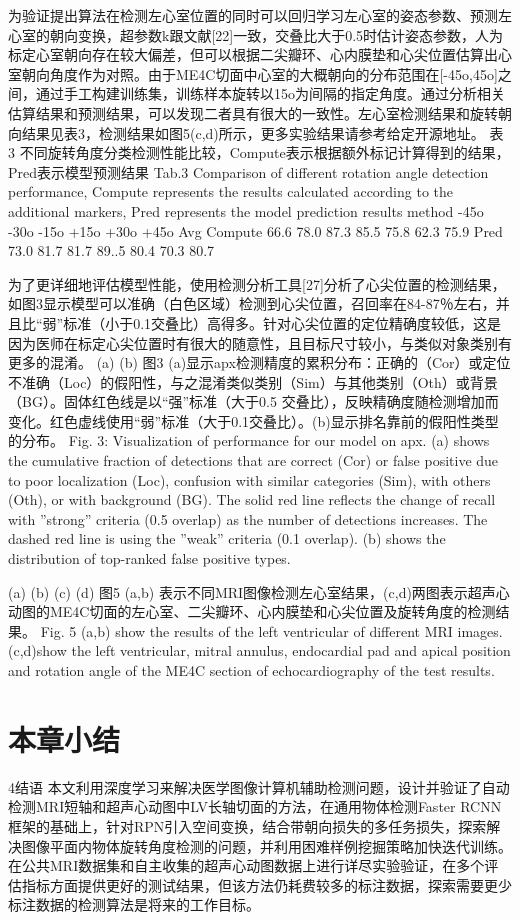 为验证提出算法在检测左心室位置的同时可以回归学习左心室的姿态参数、预测左心室的朝向变换，超参数k跟文献[22]一致，交叠比大于0.5时估计姿态参数，人为标定心室朝向存在较大偏差，但可以根据二尖瓣环、心内膜垫和心尖位置估算出心室朝向角度作为对照。由于ME4C切面中心室的大概朝向的分布范围在[-45o,45o]之间，通过手工构建训练集，训练样本旋转以15o为间隔的指定角度。通过分析相关估算结果和预测结果，可以发现二者具有很大的一致性。左心室检测结果和旋转朝向结果见表3，检测结果如图5(c,d)所示，更多实验结果请参考给定开源地址。
表 3 不同旋转角度分类检测性能比较，Compute表示根据额外标记计算得到的结果，Pred表示模型预测结果
Tab.3 Comparison of different rotation angle detection performance, Compute represents the results calculated according to the additional markers, Pred represents the model prediction results
method                -45o          -30o          -15o           +15o          +30o          +45o            Avg
Compute	66.6	78.0	87.3	85.5	75.8	62.3	75.9
Pred	73.0	81.7	81.7	89..5	80.4	70.3	80.7

为了更详细地评估模型性能，使用检测分析工具[27]分析了心尖位置的检测结果，如图3显示模型可以准确（白色区域）检测到心尖位置，召回率在84-87％左右，并且比“弱”标准（小于0.1交叠比）高得多。针对心尖位置的定位精确度较低，这是因为医师在标定心尖位置时有很大的随意性，且目标尺寸较小，与类似对象类别有更多的混淆。
 	                      (a)			                              (b)        
图3 (a)显示apx检测精度的累积分布：正确的（Cor）或定位不准确（Loc）的假阳性，与之混淆类似类别（Sim）与其他类别（Oth）或背景（BG）。固体红色线是以“强”标准（大于0.5 交叠比），反映精确度随检测增加而变化。红色虚线使用“弱”标准（大于0.1交叠比）。(b)显示排名靠前的假阳性类型的分布。
Fig. 3: Visualization of performance for our model on apx. (a) shows the cumulative fraction of detections that are correct (Cor) or false positive due to poor localization (Loc), confusion with similar categories (Sim), with others (Oth), or with background (BG). The solid red line reflects the change of recall with ”strong” criteria (0.5 overlap) as the number of detections increases. The dashed red line is using the ”weak” criteria (0.1 overlap). (b) shows the distribution of top-ranked false positive types.
 
      (a)                  (b)                     (c)                   (d)
图5 (a,b) 表示不同MRI图像检测左心室结果，(c,d)两图表示超声心动图的ME4C切面的左心室、二尖瓣环、心内膜垫和心尖位置及旋转角度的检测结果。
Fig. 5 (a,b) show the results of the left ventricular of different MRI images. (c,d)show the left ventricular, mitral annulus, endocardial pad and apical position and rotation angle of the ME4C section of echocardiography of the test results.


\section{本章小结}
4结语
本文利用深度学习来解决医学图像计算机辅助检测问题，设计并验证了自动检测MRI短轴和超声心动图中LV长轴切面的方法，在通用物体检测Faster RCNN框架的基础上，针对RPN引入空间变换，结合带朝向损失的多任务损失，探索解决图像平面内物体旋转角度检测的问题，并利用困难样例挖掘策略加快迭代训练。在公共MRI数据集和自主收集的超声心动图数据上进行详尽实验验证，在多个评估指标方面提供更好的测试结果，但该方法仍耗费较多的标注数据，探索需要更少标注数据的检测算法是将来的工作目标。